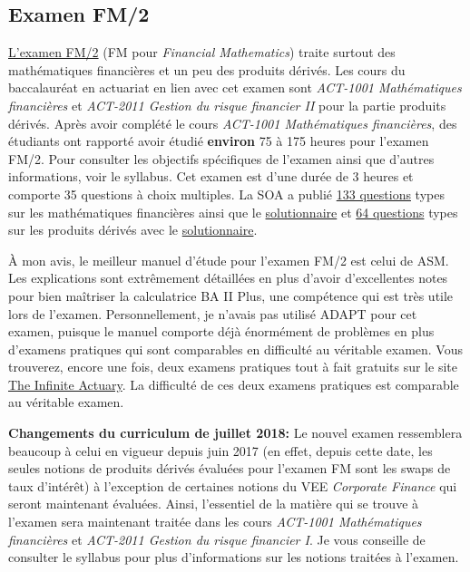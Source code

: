 \subsection*{Examen FM/2}
\label{subsec:examfm}
\href{https://www.soa.org/education/exam-req/edu-exam-fm-detail.aspx}{L'examen FM/2} (FM pour \textit{Financial Mathematics}) traite surtout des mathématiques financières et un peu des produits dérivés. Les cours du baccalauréat en actuariat en lien avec cet examen sont \textit{ACT-1001 Mathématiques financières} et \textit{ACT-2011 Gestion du risque financier II} pour la partie produits dérivés. Après avoir complété le cours \textit{ACT-1001 Mathématiques financières}, des étudiants ont rapporté avoir étudié \textbf{environ} 75 à 175 heures pour l'examen FM/2. Pour consulter les objectifs spécifiques de l'examen ainsi que d'autres informations, voir le syllabus. Cet examen est d'une durée de 3 heures et comporte 35 questions à choix multiples. La SOA a publié \href{https://www.soa.org/Files/Edu/2015/edu-2015-exam-fm-ques-theory.pdf}{133 questions} types sur les mathématiques financières ainsi que le \href{https://www.soa.org/Files/Edu/2015/edu-2015-exam-fm-sol-theory.pdf}{solutionnaire} et \href{https://www.soa.org/Files/Edu/edu-2014-10-exam-fm-ques.pdf}{64 questions} types sur les produits dérivés avec le \href{https://www.soa.org/Files/Edu/edu-2014-10-exam-fm-sol.pdf}{solutionnaire}.\vspace{\baselineskip} 

À mon avis, le meilleur manuel d'étude pour l'examen FM/2 est celui de ASM. Les explications sont extrêmement détaillées en plus d'avoir d'excellentes notes pour bien maîtriser la calculatrice BA II Plus, une compétence qui est très utile lors de l'examen. Personnellement, je n'avais pas utilisé ADAPT pour cet examen, puisque le manuel comporte déjà énormément de problèmes en plus d'examens pratiques qui sont comparables en difficulté au véritable examen. Vous trouverez, encore une fois, deux examens pratiques tout à fait gratuits sur le site \href{http://www.theinfiniteactuary.com/exams/2}{The Infinite Actuary}. La difficulté de ces deux examens pratiques est comparable au véritable examen.\vspace{\baselineskip} 

\textbf{Changements du curriculum de juillet 2018:} Le nouvel examen ressemblera beaucoup à celui en vigueur depuis juin 2017 (en effet, depuis cette date, les seules notions de produits dérivés évaluées pour l'examen FM sont les swaps de taux d'intérêt) à l'exception de certaines notions du VEE \textit{Corporate Finance} qui seront maintenant évaluées. Ainsi, l'essentiel de la matière qui se trouve à l'examen sera maintenant traitée dans les cours \textit{ACT-1001 Mathématiques financières} et \textit{ACT-2011 Gestion du risque financier I}. Je vous conseille de consulter le syllabus pour plus d'informations sur les notions traitées à l'examen.


